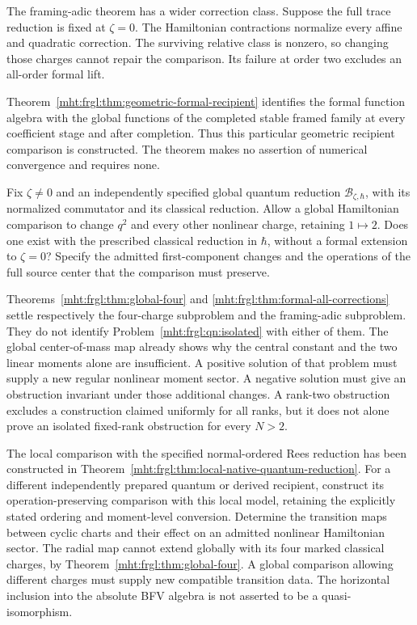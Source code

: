 The framing-adic theorem has a wider correction class. Suppose the full trace reduction is fixed at $\zeta=0$. The
Hamiltonian contractions normalize every affine and quadratic correction.
The surviving relative class is nonzero, so changing those charges
cannot repair the comparison. Its failure at order two excludes an all-order formal lift.

Theorem~\ref{mht:frgl:thm:geometric-formal-recipient}
identifies the formal function algebra with the global functions of
the completed stable framed family at every coefficient stage and
after completion. Thus this particular geometric recipient comparison
is constructed. The theorem makes no assertion of numerical convergence
and requires none.

\begin{problem}
\label{mht:frgl:qn:isolated}
Fix $\zeta\ne0$ and an independently specified global quantum reduction
$\mathcal B_{\zeta,\hbar}$, with its normalized commutator and its
classical reduction. Allow a global Hamiltonian comparison to change $q^2$ and every other
nonlinear charge, retaining $1\mapsto2$. Does one exist with the prescribed
classical reduction in $\hbar$, without a formal extension to $\zeta=0$?
Specify the admitted first-component changes and the operations of the
full source center that the comparison must preserve.
\end{problem}

Theorems~\ref{mht:frgl:thm:global-four} and
\ref{mht:frgl:thm:formal-all-corrections} settle respectively the four-charge
subproblem and the framing-adic subproblem. They do not identify
Problem~\ref{mht:frgl:qn:isolated} with either of them. The global
center-of-mass map already shows why the central constant and the two
linear moments alone are insufficient. A positive solution of that
problem must supply a new regular nonlinear moment sector. A negative
solution must give an obstruction invariant under those additional
changes. A rank-two obstruction excludes a construction claimed
uniformly for all ranks, but it does not alone prove an isolated
fixed-rank obstruction for every $N>2$.

\begin{problem}\label{mht:frgl:qn:quantum-transitions}
The local comparison with the specified normal-ordered Rees reduction
has been constructed in Theorem~\ref{mht:frgl:thm:local-native-quantum-reduction}.
For a different independently prepared quantum or derived recipient,
construct its operation-preserving comparison with this local model,
retaining the explicitly stated ordering and moment-level conversion.
Determine the transition maps between cyclic charts and their effect on
an admitted nonlinear Hamiltonian sector. The radial map cannot extend
globally with its four marked classical charges, by
Theorem~\ref{mht:frgl:thm:global-four}. A global comparison allowing different
charges must supply new compatible transition data. The horizontal
inclusion into the absolute BFV algebra is not asserted to be a
quasi-isomorphism.
\end{problem}

